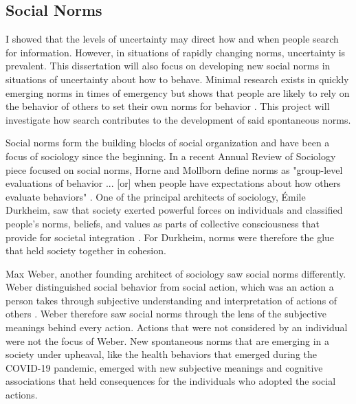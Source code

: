 \subsection{Social Norms}
I showed that the levels of uncertainty may direct how and when people
search for information. However, in situations of rapidly changing norms,
uncertainty is prevalent. This dissertation will also focus on developing
new social norms in situations of uncertainty about how to behave. 
Minimal research exists in quickly emerging
norms in times of emergency but shows that people are likely to rely on the
behavior of others to set their own norms for behavior \citep{alvarez2018,
horneNormsIntegratedFramework2020}. This project will investigate how search
contributes to the development of said spontaneous norms.

Social norms form the building blocks of social organization and have been a
focus of sociology since the beginning. In a recent Annual Review of Sociology
piece focused on social norms, Horne and Mollborn define norms as "group-level
evaluations of behavior ... [or] when people have expectations about how others
evaluate behaviors" \citeyearpar[p. 468-69]{horneNormsIntegratedFramework2020}.
One of the principal architects of sociology, \'{E}mile Durkheim, saw that
society exerted powerful forces on individuals and classified people's norms,
beliefs, and values as parts of collective consciousness that provide for
societal integration \citeyearpar{durkheimSuicide1897, durkheimDivisionLaborSociety1933}.
For Durkheim, norms were therefore the glue that held society together in cohesion.

Max Weber, another founding architect of sociology saw social norms differently.
Weber distinguished social behavior from social action, which was an action a
person takes through subjective understanding and interpretation of actions of
others \citeyearpar{weber1978economy}. Weber therefore saw social norms through
the lens of the subjective meanings behind every action. Actions that were not
considered by an individual were not the focus of Weber. New spontaneous norms
that are emerging in a society under upheaval, like the health behaviors that
emerged during the COVID-19 pandemic, emerged with new subjective meanings and
cognitive associations that held consequences for the individuals who adopted
the social actions.

